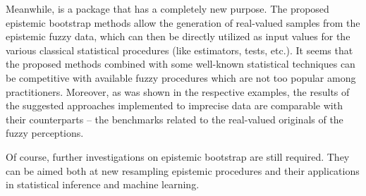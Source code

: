 Meanwhile,  is a package that has a completely new purpose. The proposed epistemic bootstrap methods allow the generation of real-valued samples from the epistemic fuzzy data, which can then be directly utilized as input values for the various classical statistical procedures (like estimators, tests, etc.). It seems that the proposed methods combined with some well-known statistical techniques can be competitive with available fuzzy procedures which are not too popular among practitioners. Moreover, as was shown in the respective examples, the results of the suggested approaches implemented to imprecise data are comparable with their counterparts -- the benchmarks related to the real-valued originals of the fuzzy perceptions.

Of course, further investigations on epistemic bootstrap are still required. They can be aimed both at new resampling epistemic procedures and their applications in statistical inference and machine learning.






  
  
  \address{Maciej Romaniuk\\
    Systems Research Institute Polish Academy of Sciences\\
    Newelska 6, 01-447 Warsaw\\
    Poland\\
	WIT Academy\\
    Newelska 6, 01-447 Warsaw\\
    Poland\\
    (0000-0001-9649-396X)\\
    }
  
  \address{Przemys{\l}aw Grzegorzewski\\
    Faculty of Mathematics and Information Science, Warsaw University of Technology \\
    Koszykowa 75, 00-662 Warsaw\\
    Poland\\
    Systems Research Institute Polish Academy of Sciences\\
    Newelska 6, 01-447 Warsaw\\
    Poland\\
    (0000-0002-5191-4123)\\
    }
    
   \address{Abbas Parchami\\
       Department of Statistics, Faculty of Mathematics and Computer\\
       Shahid Bahonar University of Kerman, Kerman\\
       Iran\\
       (0000-0002-0593-7324)\\
       }
